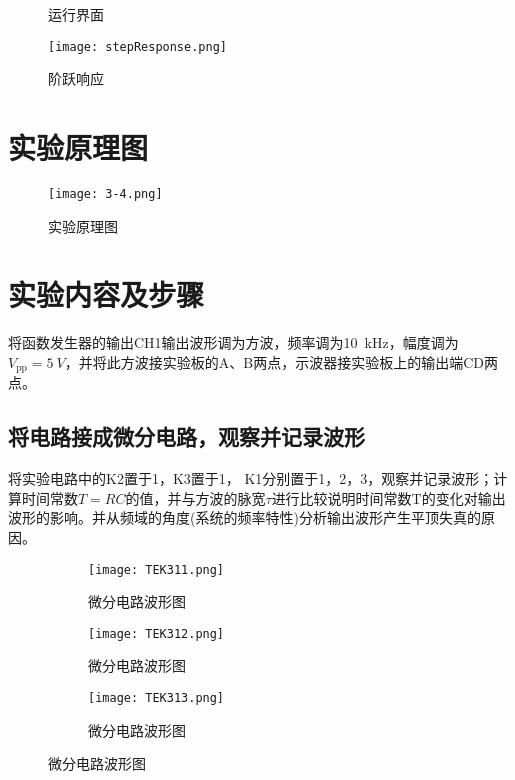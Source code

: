 
\begin{figure}[htpb]
	\centering
	\caption{运行界面}
	\label{fig:运行界面code334.m}
\end{figure}

\begin{figure}[htpb]
	\centering
	\texttt{[image: stepResponse.png]}
	\caption{阶跃响应}
	\label{fig:阶跃响应}
\end{figure}

\newpage

\section{实验原理图}%
\label{sec:实验原理图\arabic{chapter}}

\begin{figure}[htpb]
	\centering
	\texttt{[image: 3-4.png]}
	\caption{实验原理图}
	\label{fig:实验原理图\arabic{chapter}}
\end{figure}

\section{实验内容及步骤}%
\label{sec:实验内容及步骤\arabic{chapter}}

将函数发生器的输出CH1输出波形调为方波，频率调为\SI{10}{kHz}，幅度调为$ V_\text{pp}=\SI{5}{V} $，并将此方波接实验板的A、B两点，示波器接实验板上的输出端CD两点。

\subsection{将电路接成微分电路，观察并记录波形}%
\label{sub:将电路接成微分电路，观察并记录波形}

将实验电路中的K2置于1，K3置于1， K1分别置于1，2，3，观察并记录波形；计算时间常数$ T=RC $的值，并与方波的脉宽$ \tau $进行比较说明时间常数T的变化对输出波形的影响。并从频域的角度(系统的频率特性)分析输出波形产生平顶失真的原因。

\begin{figure}[htpb]
	\centering
	\begin{subfigure}[htpb]{.31\linewidth}
		\centering
		\texttt{[image: TEK311.png]}
		\caption{微分电路波形图}
		\label{fig:微分电路波形图\arabic{subfigure}}
	\end{subfigure}
	\quad
	\begin{subfigure}[htpb]{.31\linewidth}
		\centering
		\texttt{[image: TEK312.png]}
		\caption{微分电路波形图}
		\label{fig:微分电路波形图\arabic{subfigure}}
	\end{subfigure}
	\quad
	\begin{subfigure}[htpb]{.31\linewidth}
		\centering
		\texttt{[image: TEK313.png]}
		\caption{微分电路波形图}
		\label{fig:微分电路波形图\arabic{subfigure}}
	\end{subfigure}
	\caption{微分电路波形图}
	\label{fig:微分电路波形图}
\end{figure}

